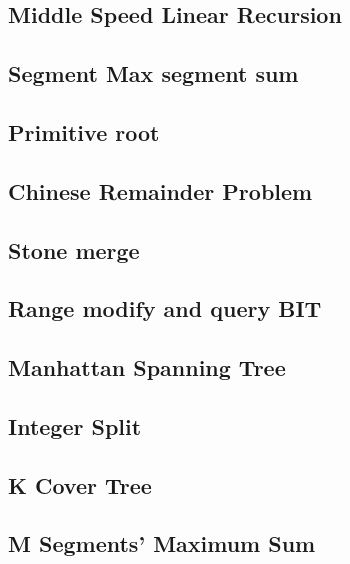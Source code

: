 \documentclass[a4paper,10pt,twocolumn,oneside]{article}
\begin{document}
\subsection{Middle Speed Linear Recursion}


\subsection{Segment Max segment sum}


\subsection{Primitive root}


\subsection{Chinese Remainder Problem}


\subsection{Stone merge}


\subsection{Range modify and query BIT}


\subsection{Manhattan Spanning Tree}


\subsection{Integer Split}


\subsection{K Cover Tree}


\subsection{M Segments' Maximum Sum}

\end{document}
